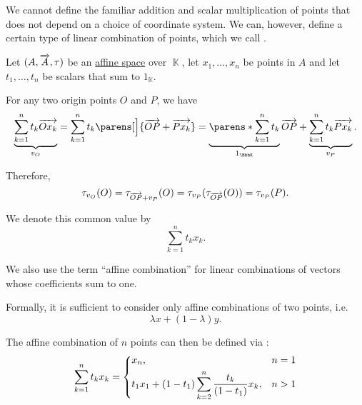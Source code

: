 \begin{definition}\label{def:affine_combinations}
  We cannot define the familiar addition and scalar multiplication of points that does not depend on a choice of coordinate system. We can, however, define a certain type of linear combination of points, which we call .

  Let \( (A, \overrightarrow{A}, \tau) \) be an \hyperref[def:affine_space]{affine space} over \( \BbbK \), let \( x_1, \ldots, x_n \) be points in \( A \) and let \( t_1, \ldots, t_n \) be scalars that sum to \( 1_\BbbK \).

  For any two origin points \( O \) and \( P \), we have
  \begin{equation*}
    \underbrace{ \sum_{k=1}^n t_k \vect{O x_k} }_{v_O}
    =
    \sum_{k=1}^n t_k \parens[\Big]{ \vect{OP} + \vect{P x_k} }
    =
    \underbrace{ \parens*{ \sum_{k=1}^n t_k } }_{1_\BbbK} \vect{OP} + \underbrace{ \sum_{k=1}^n t_k \vect{P x_k} }_{v_P}.
  \end{equation*}

  Therefore,
  \begin{equation*}
    \tau_{v_O}(O) = \tau_{\overrightarrow{OP} + v_P}(O) = \tau_{v_P}(\tau_{\overrightarrow{OP}}(O)) = \tau_{v_P}(P).
  \end{equation*}

  We denote this common value by
  \begin{equation*}
    \sum_{k=1}^n t_k x_k.
  \end{equation*}

  We also use the term \enquote{affine combination} for linear combinations of vectors whose coefficients sum to one.

  Formally, it is sufficient to consider only affine combinations of two points, i.e.
  \begin{equation}\label{eq:def:affine_combinations}
    \lambda x + (1 - \lambda) y.
  \end{equation}

  The affine combination of \( n \) points can then be defined via :
  \begin{equation*}
    \sum_{k=1}^n t_k x_k = \begin{dcases}
      x_n,                                                          &n = 1 \\
      t_1 x_1 + (1 - t_1) \sum_{k=2}^n \frac {t_k} {(1 - t_1)} x_k, &n > 1
    \end{dcases}
  \end{equation*}
\end{definition}

